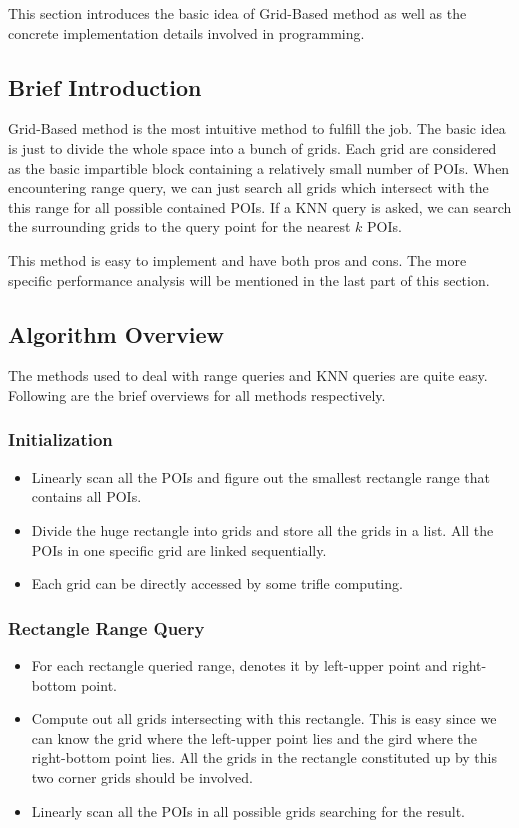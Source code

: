 \documentclass{acm_proc_article-sp}
\begin{document}
This section introduces the basic idea of Grid-Based method as well as the concrete implementation details involved in programming.

\subsection{Brief Introduction }

Grid-Based method is the most intuitive method to fulfill the job. The basic idea is just to divide the whole space into a bunch of grids. Each grid are considered as the basic impartible block containing a relatively small number of POIs. When encountering range query, we can just search all grids which intersect with the this range for all possible contained POIs. If a KNN query is asked, we can search the surrounding grids to the query point for the nearest $k$ POIs.

This method is easy to implement and have both pros and cons. The more specific performance analysis will be mentioned in the last part of this section.


\subsection{Algorithm Overview } 

The methods used to deal with range queries and KNN queries are quite easy. Following are the brief overviews for all methods respectively.

\subsubsection{Initialization}
\begin{itemize}
\item  Linearly scan all the POIs and figure out the smallest rectangle range that contains all POIs.
\item Divide the huge rectangle into grids and store all the grids in a list. All the POIs in one specific grid are linked sequentially.
\item Each grid can be directly accessed by some trifle computing.
\end{itemize}

\subsubsection{Rectangle Range Query}
\begin{itemize}
\item For each rectangle queried range, denotes it by left-upper point and right-bottom point.
\item Compute out all grids intersecting with this rectangle. This is easy since we can know the grid where the left-upper point lies and the gird where the right-bottom point lies. All the grids in the rectangle constituted up by this two corner grids should be involved.
\item Linearly scan all the POIs in all possible grids searching for the result.
\end{itemize}
\end{document}
